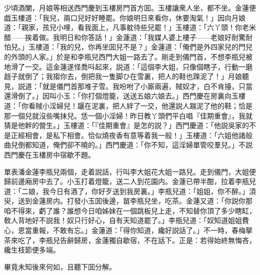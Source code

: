 少頃酒闌，月娘等相送西門慶到玉樓房門首方囬。玉樓讓衆人坐，都不坐。金蓮便戯玉樓道：「我兒，兩口兒好好睡罷。你娘明日來看你，休要淘氣！」因向月娘道：「親家，孩兒小哩，看我面上，凡事躭待些兒罷！」玉樓道：「六丫頭！你老米醋——挨着做。我明日和你答話！」金蓮道：「我媒人婆上樓子——老娘好耐驚耐怕兒。」玉樓道：「我的兒，你再坐囬兒不是？」金蓮道：「俺們是外四家兒的門兒的外頭的人家。」於是和李瓶兒西門大姐一路去了。剛走到儀門首，不想李瓶兒被地滑了一交。這金蓮遂怪喬呌起來，説道：「這個李大姐，只像個瞎子，行動一磨趄子就倒了；我搊你去，倒把我一隻脚ひ在雪裏，把人的鞋也䠕泥了！」月娘聽見，説道：「就是儀門首那堆子雪。我吩咐了小廝兩遍，賊奴才，白不肯擡，只當還滑倒了。」因叫小玉：「你打個燈籠，送送五娘六娘去。」西門慶在房裏向玉樓道：「你看賊小淫婦兒！躧在泥裏，把人絆了一交，他還説人踹泥了他的鞋；恰是那一個兒就沒些嘴抹兒。恁一個小淫婦！昨日教丫頭們平白唱『佳期重會』，我就猜是他幹的營生。」玉樓道：「『佳期重會』是怎的説？」西門慶道：「他説吳家的不是正經相會，是私下相會。恰似燒夜香有意等着我一般！」玉樓道：「六姐他諸般曲兒倒都知道，俺們卻不曉的。」西門慶道：「你不知，這淫婦單管咬羣兒。」不説西門慶在玉樓房中宿歇不題。

單表潘金蓮李瓶兒兩個，走着説話，行叫李大姐花大姐一路兒。走到儀門，大姐便歸前邊廂房中去了。小玉打着燈籠，送二人到花園内。金蓮已帶半酣，拉着李瓶兒道：「二娘，我今日有酒了，你好歹送到我房裏。」李瓶兒道：「姐姐，你不醉。」湏臾，送到金蓮房内。打發小玉囬後邊，㽞李瓶兒坐，吃茶。金蓮又道：「你説你那咱不得來，虧了誰？誰想今日咱姊妹在一個跳板兒上走，不知替你頂了多少瞎缸，敎人背地好不説我！奴只行好心，自有天知道罷了。」李瓶兒道：「奴知道姐姐費心，恩當重報，不敢有忘。」金蓮道：「得你知道，纔好説話了。」不一時，春梅拏茶來吃了，李瓶兒告辭歸房，金蓮獨自歇宿，不在話下。正是：若得始終無悔吝，纔生枝節便多端。

畢竟未知後來何如，且聽下囬分解。

